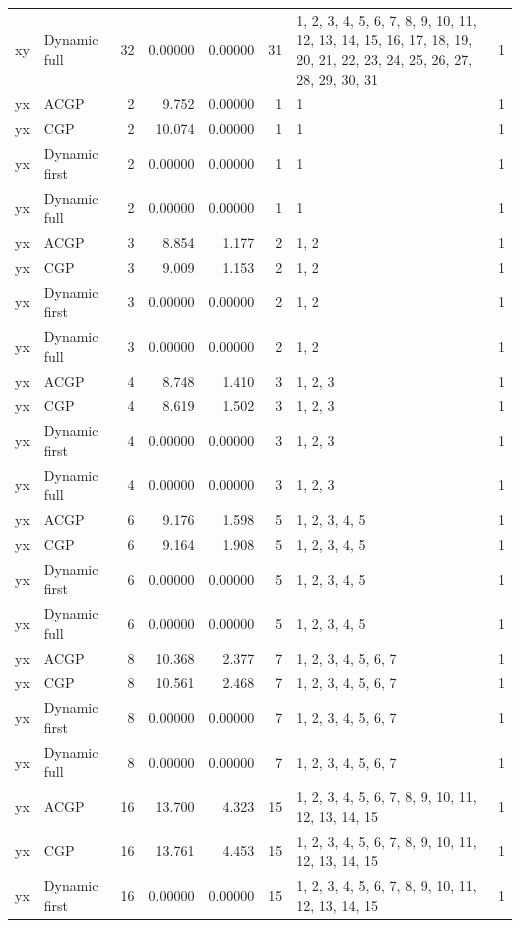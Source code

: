 \documentclass[10pt,a4paper]{article}
\begin{document}
\begin{longtable}{@{}p{23mm}p{29mm}rrrrp{36mm}r@{}}
xy & Dynamic full & 32 & 0.00000 & 0.00000 & 31 & 1, 2, 3, 4, 5, 6, 7, 8, 9, 10, 11, 12, 13, 14, 15, 16, 17, 18, 19, 20, 21, 22, 23, 24, 25, 26, 27, 28, 29, 30, 31 & 1 \\
yx & ACGP & 2 & 9.752 & 0.00000 & 1 & 1 & 1 \\
yx & CGP & 2 & 10.074 & 0.00000 & 1 & 1 & 1 \\
yx & Dynamic first & 2 & 0.00000 & 0.00000 & 1 & 1 & 1 \\
yx & Dynamic full & 2 & 0.00000 & 0.00000 & 1 & 1 & 1 \\
yx & ACGP & 3 & 8.854 & 1.177 & 2 & 1, 2 & 1 \\
yx & CGP & 3 & 9.009 & 1.153 & 2 & 1, 2 & 1 \\
yx & Dynamic first & 3 & 0.00000 & 0.00000 & 2 & 1, 2 & 1 \\
yx & Dynamic full & 3 & 0.00000 & 0.00000 & 2 & 1, 2 & 1 \\
yx & ACGP & 4 & 8.748 & 1.410 & 3 & 1, 2, 3 & 1 \\
yx & CGP & 4 & 8.619 & 1.502 & 3 & 1, 2, 3 & 1 \\
yx & Dynamic first & 4 & 0.00000 & 0.00000 & 3 & 1, 2, 3 & 1 \\
yx & Dynamic full & 4 & 0.00000 & 0.00000 & 3 & 1, 2, 3 & 1 \\
yx & ACGP & 6 & 9.176 & 1.598 & 5 & 1, 2, 3, 4, 5 & 1 \\
yx & CGP & 6 & 9.164 & 1.908 & 5 & 1, 2, 3, 4, 5 & 1 \\
yx & Dynamic first & 6 & 0.00000 & 0.00000 & 5 & 1, 2, 3, 4, 5 & 1 \\
yx & Dynamic full & 6 & 0.00000 & 0.00000 & 5 & 1, 2, 3, 4, 5 & 1 \\
yx & ACGP & 8 & 10.368 & 2.377 & 7 & 1, 2, 3, 4, 5, 6, 7 & 1 \\
yx & CGP & 8 & 10.561 & 2.468 & 7 & 1, 2, 3, 4, 5, 6, 7 & 1 \\
yx & Dynamic first & 8 & 0.00000 & 0.00000 & 7 & 1, 2, 3, 4, 5, 6, 7 & 1 \\
yx & Dynamic full & 8 & 0.00000 & 0.00000 & 7 & 1, 2, 3, 4, 5, 6, 7 & 1 \\
yx & ACGP & 16 & 13.700 & 4.323 & 15 & 1, 2, 3, 4, 5, 6, 7, 8, 9, 10, 11, 12, 13, 14, 15 & 1 \\
yx & CGP & 16 & 13.761 & 4.453 & 15 & 1, 2, 3, 4, 5, 6, 7, 8, 9, 10, 11, 12, 13, 14, 15 & 1 \\
yx & Dynamic first & 16 & 0.00000 & 0.00000 & 15 & 1, 2, 3, 4, 5, 6, 7, 8, 9, 10, 11, 12, 13, 14, 15 & 1 \\

\end{longtable}
\end{document}

